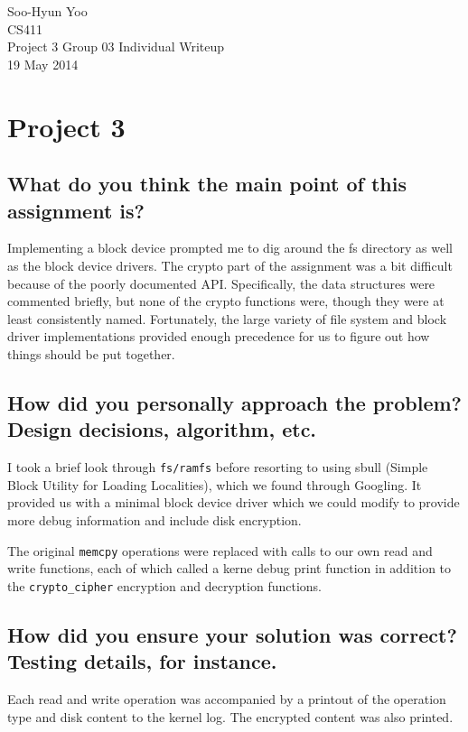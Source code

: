 \documentclass[11pt,letterpaper]{article}
\begin{document}
Soo-Hyun Yoo \\
CS411 \\
Project 3 Group 03 Individual Writeup \\
19 May 2014


\section*{Project 3}

\subsection*{What do you think the main point of this assignment is?}

Implementing a block device prompted me to dig around the fs directory as well
as the block device drivers. The crypto part of the assignment was a bit
difficult because of the poorly documented API. Specifically, the data
structures were commented briefly, but none of the crypto functions were,
though they were at least consistently named. Fortunately, the large variety of
file system and block driver implementations provided enough precedence for us
to figure out how things should be put together.


\subsection*{How did you personally approach the problem? Design decisions,
algorithm, etc.}

I took a brief look through \verb|fs/ramfs| before resorting to using sbull
(Simple Block Utility for Loading Localities), which we found through Googling.
It provided us with a minimal block device driver which we could modify to
provide more debug information and include disk encryption.

The original \verb|memcpy| operations were replaced with calls to our own read
and write functions, each of which called a kerne debug print function in
addition to the \verb|crypto_cipher| encryption and decryption functions.


\subsection*{How did you ensure your solution was correct? Testing details, for
instance.}

Each read and write operation was accompanied by a printout of the operation
type and disk content to the kernel log. The encrypted content was also
printed.
\end{document}
